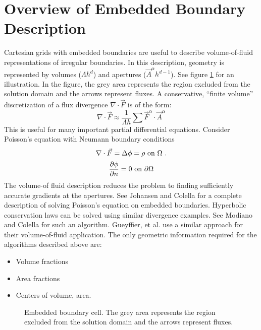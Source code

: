 \section{Overview of Embedded Boundary Description}

Cartesian grids with embedded boundaries are 
useful to describe
volume-of-fluid representations of irregular boundaries.
In this description,
geometry is represented by volumes ($\Lambda h^d$) and apertures 
($\vec{A}^\alpha h^{d-1}$).   See figure \ref{fig::volume}
for an illustration.  In the figure, the grey area represents 
the region excluded from the solution domain and the arrows represent
fluxes.  A conservative, ``finite volume'' discretization
of a flux divergence $\nabla \cdot \vec{F}$ is of the form:
\begin{equation}
\nabla \cdot \vec{F} \approx \frac{1}{\Lambda h} \sum \vec{F}^\alpha \cdot
\vec{A}^\alpha
\end{equation}
This is useful for many important partial differential equations.
Consider  Poisson's equation with Neumann boundary conditions
\begin{equation}
\nabla \cdot \vec{F} = \Delta \phi = \rho \hbox{ on $\Omega$ }.
\end{equation}
\begin{equation}
\frac{\partial \phi}{\partial n} = 0 \hbox{ on $\partial \Omega$}
\end{equation}
The volume-of fluid description reduces the problem to finding
sufficiently accurate gradients at the apertures.   See Johansen
and Colella \cite{JohansenColella1998} for a complete description
of solving Poisson's equation on embedded boundaries.  Hyperbolic 
conservation laws can be solved using similar divergence
examples.  See Modiano and Colella \cite{ModianoColella2000}
for such an algorithm.  Gueyffier, et al. \cite{sandz:1999} 
use a similar approach for their volume-of-fluid application.
The only geometric information required for the algorithms described
above are:
\begin{itemize}
\item
Volume fractions
\item
Area fractions
\item 
Centers of volume, area.
\end{itemize}

\begin{figure}
\epsfxsize=2.0in
\hspace{2.0in} 
\caption{Embedded boundary cell. The grey area represents 
the region excluded from the solution domain and the arrows represent
fluxes.}
\label{fig::volume}
\end{figure}

